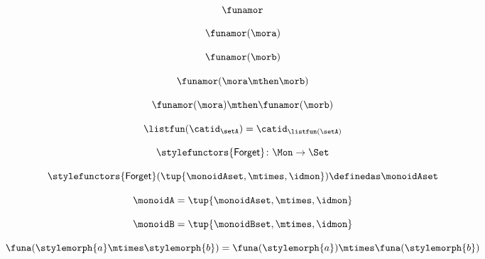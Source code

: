\begin{forslides}
    \begin{equation}
        \label{eq:slides-translation-08}
        \funamor
    \end{equation}

    \begin{equation}
        \label{eq:slides-translation-09}
       \funamor(\mora)
    \end{equation}

    \begin{equation}
        \label{eq:slides-translation-10}
        \funamor(\morb)
    \end{equation}

    \begin{equation}
        \label{eq:slides-translation-11}
        \funamor(\mora \mthen \morb)
    \end{equation}

    \begin{equation}
        \label{eq:slides-translation-12}
        \funamor (\mora) \mthen \funamor (\morb)
    \end{equation}

    \begin{equation}
        \label{eq:slides-translation-13}
        \listfun(\catid_\setA) = \catid_{\listfun(\setA)}
    \end{equation}

    \begin{equation}
        \label{eq:slides-translation-14}
        \stylefunctors{\mathsf{Forget}} \colon \Mon \to \Set
    \end{equation}

    \begin{equation}
        \label{eq:slides-translation-15}
        \stylefunctors{\mathsf{Forget}}(\tup{{\monoidAset}, \mtimes, \idmon}) \definedas \monoidAset
    \end{equation}

    \begin{equation}
        \label{eq:slides-translation-16}
        \monoidA = \tup{{\monoidAset}, \mtimes, \idmon}
    \end{equation}

    \begin{equation}
        \label{eq:slides-translation-17}
       \monoidB = \tup{{\monoidBset}, \mtimes, \idmon}
    \end{equation}

    \begin{equation}
        \label{eq:slides-translation-18}
        \funa ( \stylemorph{a} \mtimes \stylemorph{b} ) =  \funa(\stylemorph{a}) \mtimes \funa(\stylemorph{b})
    \end{equation}


\end{forslides}
